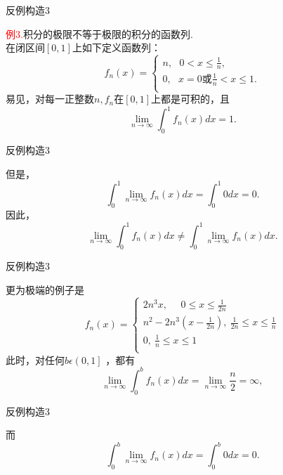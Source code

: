 \documentclass{beamer}
\begin{document}
\begin{frame}{反例构造3}
	\begin{spacing}{1.5}
		\textcolor{red}{例3.}积分的极限不等于极限的积分的函数列.\\
		在闭区间$\left[ 0,1 \right]$上如下定义函数列：
		$$
		f_n\left( x \right) =\left\{ \begin{array}{l}
			n,\,\,\,\,0<x\le \frac{1}{n},\\
			0,\,\,\,\,x=0\text{或}\frac{1}{n}<x\le 1.\\
		\end{array} \right. 
		$$
		易见，对每一正整数$n,f_n$在$\left[ 0,1 \right]$上都是可积的，且
		$$\lim_{n\rightarrow \infty}\int_0^1{f_n\left( x \right) dx=1.}$$
	\end{spacing}
\end{frame}


\begin{frame}{反例构造3}
	\begin{spacing}{1.5}
		但是，
		$$\int_0^1{\lim_{n\rightarrow \infty}}f_n\left( x \right) dx=\int_0^1{0dx=0.}$$
		因此，
		$$\lim_{n\rightarrow \infty}\int_0^1{f_n\left( x \right) dx\ne}\int_0^1{\lim_{n\rightarrow \infty}}f_n\left( x \right) dx.$$
		
	\end{spacing}
\end{frame}


\begin{frame}{反例构造3}
	\begin{spacing}{1.5}
		更为极端的例子是
		$$f_n\left( x \right) =\left\{ \begin{array}{l}
			2n^3x,\ \ \ \ \ \ 0\le x\le \frac{1}{2n}\\
			n^2-2n^3\left( x-\frac{1}{2n} \right) ,\ \frac{1}{2n}\le x\le \frac{1}{n}\\
			0,\ \frac{1}{n}\le x\le 1\\
		\end{array} \right. 
		$$
		此时，对任何$b\epsilon \left( 0,1 \right]$
		，都有
		$$\lim_{n\rightarrow \infty}\int_0^b{f_n\left( x \right) dx=}\lim_{n\rightarrow \infty}\frac{n}{2}=\infty ,$$
	\end{spacing}
\end{frame}


\begin{frame}{反例构造3}
	\begin{spacing}{1.5}
		而
		$$\int_0^b{\lim_{n\rightarrow \infty}f_n\left( x \right) dx=}\int_0^b{0dx=0.}$$
	\end{spacing}
\end{frame}
\end{document}
